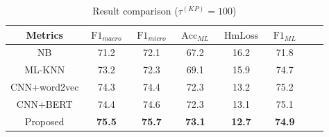 \begin{table}
    \centering
    \caption{Result comparison (\(\tau^{(KP)}=100 \))}\label{tbl:bsline2}
    \begin{tabular}{cccccccc}
        \toprule
        Metrics      & \(\operatorname{F1}_{macro}\) & \(\operatorname{F1}_{micro}\) & \(\operatorname{Acc}_{ML}\) & \(\operatorname{HmLoss}\) & \(\operatorname{F1}_{ML}\) \\
        \midrule
        NB           & 71.2                          & 72.1                          & 67.2                        & 16.2                      & 71.8                       \\
        ML-KNN       & 73.2                          & 72.3                          & 69.1                        & 15.9                      & 74.7                       \\
        CNN+word2vec & 74.3                          & 74.4                          & 72.3                        & 13.2                      & 75.2                       \\
        CNN+BERT     & 74.4                          & 74.6                          & 72.3                        & 13.1                      & 75.1                       \\
        Proposed     & \textbf{75.5}                 & \textbf{75.7}                 & \textbf{73.1}               & \textbf{12.7}             & \textbf{74.9}              \\
        \bottomrule
    \end{tabular}
\end{table}


